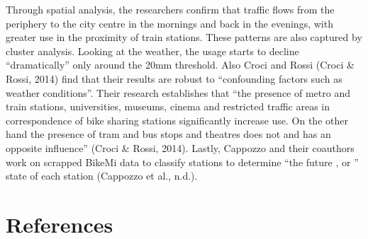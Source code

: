 \documentclass[letterpaper,10pt,english]{jupyterBook}
\begin{document}
\sphinxAtStartPar
Through spatial analysis, the researchers confirm that traffic flows from the periphery to the city centre in the mornings and back in the evenings, with greater use in the proximity of train stations. These patterns are also captured by cluster analysis. Looking at the weather, the usage starts to decline “dramatically” only around the 20mm threshold. Also Croci and Rossi (Croci \& Rossi, 2014) find that their results are robust to “confounding factors such as weather conditions”. Their research establishes that “the presence of metro and train stations, universities, museums, cinema and restricted traffic areas in correspondence of bike sharing stations significantly increase use. On the other hand the presence of tram and bus stops and theatres does not and has an opposite influence” (Croci \& Rossi, 2014). Lastly, Cappozzo and their coauthors work on scrapped BikeMi data to classify stations to determine “the future ,  or ” state of each station (Cappozzo et al., n.d.).


\section{References}
\label{\detokenize{02-bikesharing_and_bikemi:references}}
\end{document}
